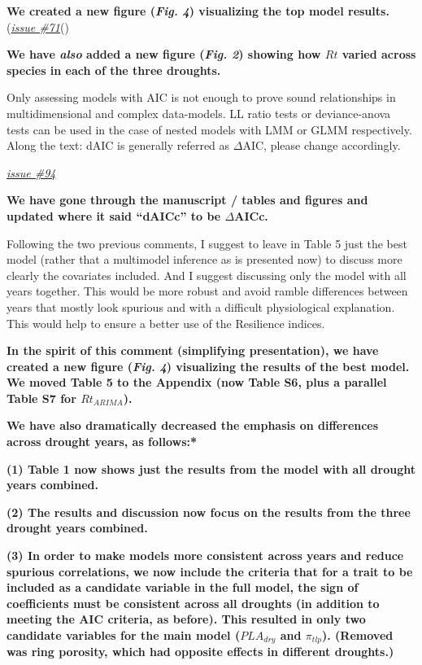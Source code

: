 \documentclass[
]{article}
\begin{document}
\textbf{We created a new figure (\emph{Fig. 4}) visualizing the top
model results.}
(\href{https://github.com/SCBI-ForestGEO/McGregor_climate-sensitivity-variation/issues/71}{\emph{issue
\#71}}()

\textbf{We have \emph{also} added a new figure (\emph{Fig. 2}) showing
how \(Rt\) varied across species in each of the three droughts.}

Only assessing models with AIC is not enough to prove sound
relationships in multidimensional and complex data-models. LL ratio
tests or deviance-anova tests can be used in the case of nested models
with LMM or GLMM respectively. Along the text: dAIC is generally
referred as \(\Delta\)AIC, please change accordingly.

\href{https://github.com/SCBI-ForestGEO/McGregor_climate-sensitivity-variation/issues/94}{\emph{issue
\#94}}

\textbf{We have gone through the manuscript / tables and figures and
updated where it said ``dAICc'' to be \(\Delta\)AICc. }

Following the two previous comments, I suggest to leave in Table 5 just
the best model (rather that a multimodel inference as is presented now)
to discuss more clearly the covariates included. And I suggest
discussing only the model with all years together. This would be more
robust and avoid ramble differences between years that mostly look
spurious and with a difficult physiological explanation. This would help
to ensure a better use of the Resilience indices.

\textbf{In the spirit of this comment (simplifying presentation), we
have created a new figure (\emph{Fig. 4}) visualizing the results of the
best model. We moved Table 5 to the Appendix (now Table S6, plus a
parallel Table S7 for \(Rt_{ARIMA}\)).}

\textbf{We have also dramatically decreased the emphasis on differences
across drought years, as follows:* }

\textbf{(1) Table 1 now shows just the results from the model with all
drought years combined.}

\textbf{(2) The results and discussion now focus on the results from the
three drought years combined.}

\textbf{(3) In order to make models more consistent across years and
reduce spurious correlations, we now include the criteria that for a
trait to be included as a candidate variable in the full model, the sign
of coefficients must be consistent across all droughts (in addition to
meeting the AIC criteria, as before). This resulted in only two
candidate variables for the main model (\(PLA_{dry}\) and
\(\pi_{tlp}\)). (Removed was ring porosity, which had opposite effects
in different droughts.)}
\end{document}
